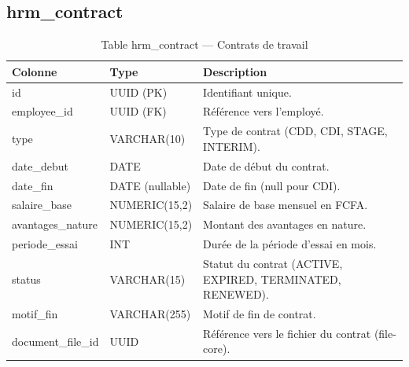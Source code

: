 \documentclass[a4paper,12pt,openany]{book}
\begin{document}
    \subsection{hrm\_contract}
    \begin{table}[H]
        \centering
        \caption{Table hrm\_contract — Contrats de travail}
        \begin{tabularx}{\textwidth}{llX}
    \toprule
    \textbf{Colonne} & \textbf{Type} & \textbf{Description} \\
    \midrule
    id               & UUID (PK)         & Identifiant unique. \\
    employee\_id     & UUID (FK)         & Référence vers l'employé. \\
    type             & VARCHAR(10)       & Type de contrat (CDD, CDI, STAGE, INTERIM). \\
    date\_debut      & DATE              & Date de début du contrat. \\
    date\_fin        & DATE (nullable)   & Date de fin (null pour CDI). \\
    salaire\_base    & NUMERIC(15,2)     & Salaire de base mensuel en FCFA. \\
    avantages\_nature & NUMERIC(15,2)    & Montant des avantages en nature. \\
    periode\_essai   & INT               & Durée de la période d'essai en mois. \\
    status           & VARCHAR(15)       & Statut du contrat (ACTIVE, EXPIRED, TERMINATED, RENEWED). \\
    motif\_fin       & VARCHAR(255)      & Motif de fin de contrat. \\
    document\_file\_id & UUID            & Référence vers le fichier du contrat (file-core). \\
    \bottomrule
        \end{tabularx}
    \end{table}
\end{document}

